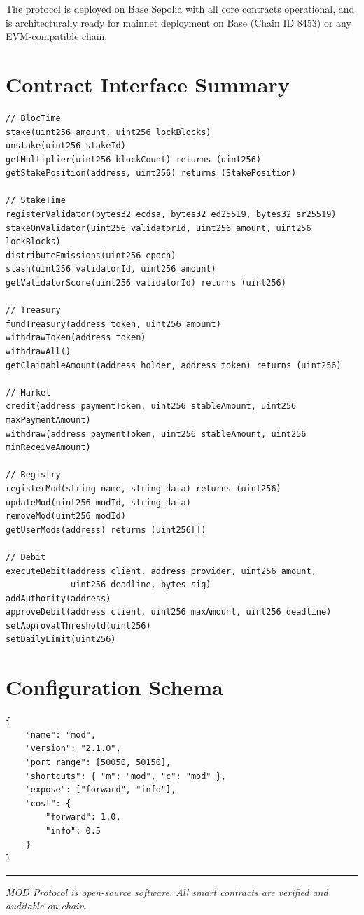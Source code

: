 \documentclass[11pt,a4paper]{article}
\begin{document}
The protocol is deployed on Base Sepolia with all core contracts operational, and is architecturally ready for mainnet deployment on Base (Chain ID 8453) or any EVM-compatible chain.

\appendix

\section{Contract Interface Summary}
\label{app:interfaces}

\begin{lstlisting}[style=solidity]
// BlocTime
stake(uint256 amount, uint256 lockBlocks)
unstake(uint256 stakeId)
getMultiplier(uint256 blockCount) returns (uint256)
getStakePosition(address, uint256) returns (StakePosition)

// StakeTime
registerValidator(bytes32 ecdsa, bytes32 ed25519, bytes32 sr25519)
stakeOnValidator(uint256 validatorId, uint256 amount, uint256 lockBlocks)
distributeEmissions(uint256 epoch)
slash(uint256 validatorId, uint256 amount)
getValidatorScore(uint256 validatorId) returns (uint256)

// Treasury
fundTreasury(address token, uint256 amount)
withdrawToken(address token)
withdrawAll()
getClaimableAmount(address holder, address token) returns (uint256)

// Market
credit(address paymentToken, uint256 stableAmount, uint256 maxPaymentAmount)
withdraw(address paymentToken, uint256 stableAmount, uint256 minReceiveAmount)

// Registry
registerMod(string name, string data) returns (uint256)
updateMod(uint256 modId, string data)
removeMod(uint256 modId)
getUserMods(address) returns (uint256[])

// Debit
executeDebit(address client, address provider, uint256 amount,
             uint256 deadline, bytes sig)
addAuthority(address)
approveDebit(address client, uint256 maxAmount, uint256 deadline)
setApprovalThreshold(uint256)
setDailyLimit(uint256)
\end{lstlisting}

\section{Configuration Schema}
\label{app:config}

\begin{lstlisting}[basicstyle=\ttfamily\small, frame=single, backgroundcolor=\color{codebg}]
{
    "name": "mod",
    "version": "2.1.0",
    "port_range": [50050, 50150],
    "shortcuts": { "m": "mod", "c": "mod" },
    "expose": ["forward", "info"],
    "cost": {
        "forward": 1.0,
        "info": 0.5
    }
}
\end{lstlisting}


\vspace{1cm}
\noindent\rule{\textwidth}{0.4pt}
\begin{center}
\textit{MOD Protocol is open-source software. All smart contracts are verified and auditable on-chain.}
\end{center}
\end{document}
